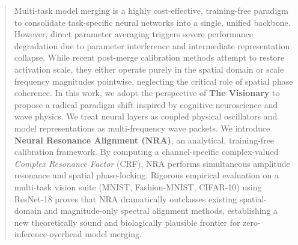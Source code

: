 \documentclass{article}
\theoremstyle{plain}
\theoremstyle{definition}
\theoremstyle{remark}
\begin{document}

\printAffiliationsAndNotice{}

\begin{abstract}
Multi-task model merging is a highly cost-effective, training-free paradigm to consolidate task-specific neural networks into a single, unified backbone. However, direct parameter averaging triggers severe performance degradation due to parameter interference and intermediate representation collapse. While recent post-merge calibration methods attempt to restore activation scale, they either operate purely in the spatial domain or scale frequency magnitudes pointwise, neglecting the critical role of spatial phase coherence. In this work, we adopt the perspective of \textbf{The Visionary} to propose a radical paradigm shift inspired by cognitive neuroscience and wave physics. We treat neural layers as coupled physical oscillators and model representations as multi-frequency wave packets. We introduce \textbf{Neural Resonance Alignment (NRA)}, an analytical, training-free calibration framework. By computing a channel-specific complex-valued \textit{Complex Resonance Factor} (CRF), NRA performs simultaneous amplitude resonance and spatial phase-locking. Rigorous empirical evaluation on a multi-task vision suite (MNIST, Fashion-MNIST, CIFAR-10) using ResNet-18 proves that NRA dramatically outclasses existing spatial-domain and magnitude-only spectral alignment methods, establishing a new theoretically sound and biologically plausible frontier for zero-inference-overhead model merging.
\end{abstract}
\end{document}

